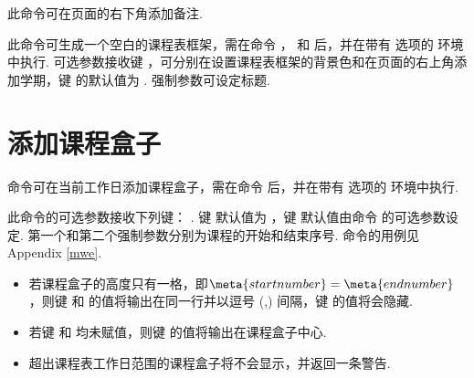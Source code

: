 \documentclass[letterpaper]{l3doc}
\begin{document}
\begin{function}{\more}
  \begin{syntax}
     
  \end{syntax}

  此命令可在页面的右下角添加备注.
\end{function}

\begin{function}{\maketable}
  \begin{syntax}
       
  \end{syntax}

  此命令可生成一个空白的课程表框架，需在命令 ， 和  后，并在带有  选项的  环境中执行. 可选参数接收键  ，可分别在设置课程表框架的背景色和在页面的右上角添加学期，键  的默认值为 . 强制参数可设定标题.
\end{function}

\section{添加课程盒子}

\begin{function}{\course}
  \begin{syntax}
         
  \end{syntax}

   命令可在当前工作日添加课程盒子，需在命令  后，并在带有  选项的  环境中执行.
  
  此命令的可选参数接收下列键：    . 键  默认值为 ，键  默认值由命令  的可选参数设定. 第一个和第二个强制参数分别为课程的开始和结束序号. 命令的用例见Appendix \ref{mwe}.
  
  \begin{itemize}
    \item 若课程盒子的高度只有一格，即$\meta{start number} = \meta{end number}$，则键  和  的值将输出在同一行并以逗号 (,) 间隔，键  的值将会隐藏.
    \item 若键  和  均未赋值，则键  的值将输出在课程盒子中心.
    \item 超出课程表工作日范围的课程盒子将不会显示，并返回一条警告.
  \end{itemize}
\end{function}
\end{document}
